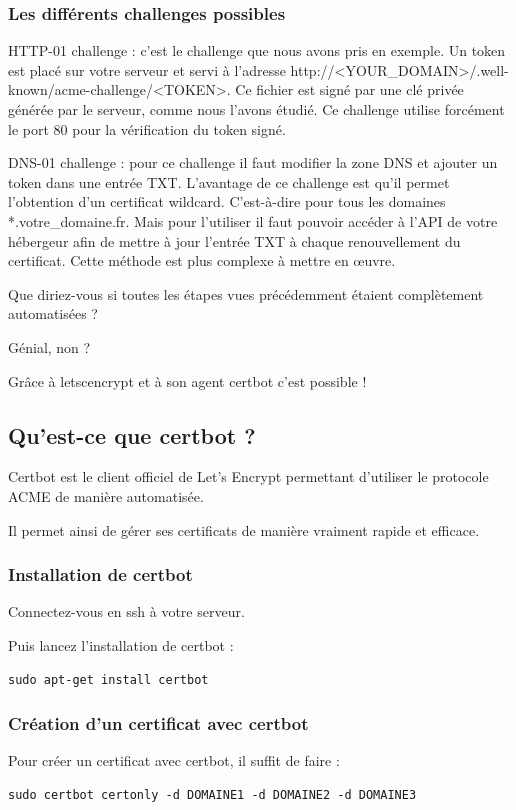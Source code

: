 \documentclass{article}
\begin{document}
\subsubsection{Les différents challenges possibles}
HTTP-01 challenge : c'est le challenge que nous avons pris en exemple. Un token est placé sur votre serveur et servi à l'adresse http://<YOUR\_DOMAIN>/.well-known/acme-challenge/<TOKEN>. Ce fichier est signé par une clé privée générée par le serveur, comme nous l'avons étudié. Ce challenge utilise forcément le port 80 pour la vérification du token signé.

DNS-01 challenge : pour ce challenge il faut modifier la zone DNS et ajouter un token dans une entrée TXT. L'avantage de ce challenge est qu'il permet l'obtention d'un certificat wildcard. C'est-à-dire pour tous les domaines *.votre\_domaine.fr. Mais pour l'utiliser il faut pouvoir accéder à l'API de votre hébergeur afin de mettre à jour l'entrée TXT à chaque renouvellement du certificat. Cette méthode est plus complexe à mettre en œuvre.

Que diriez-vous si toutes les étapes vues précédemment étaient complètement automatisées ?

Génial, non ?

Grâce à letscencrypt et à son agent certbot c'est possible !

\subsection{Qu'est-ce que certbot ?}
Certbot est le client officiel de Let's Encrypt permettant d'utiliser le protocole ACME de manière automatisée.

Il permet ainsi de gérer ses certificats de manière vraiment rapide et efficace.

\subsubsection{Installation de certbot}
Connectez-vous en ssh à votre serveur.

Puis lancez l'installation de certbot :
\begin{verbatim}
sudo apt-get install certbot
\end{verbatim}

\subsubsection{Création d'un certificat avec certbot}
Pour créer un certificat avec certbot, il suffit de faire :
\begin{verbatim}
sudo certbot certonly -d DOMAINE1 -d DOMAINE2 -d DOMAINE3
\end{verbatim}
\end{document}
